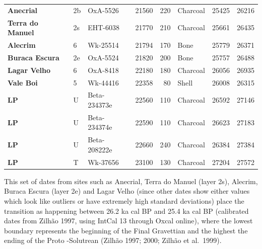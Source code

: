 \documentclass[12pt,twoside]{reedthesis}
\begin{document}
\begin{table}
\begin{tabular}[t]{>{\bfseries}lllrrlrr}
Anecrial & 2b & OxA-5526 & 21560 & 220 & Charcoal & 25425 & 26216\\
Terra do Manuel & 2s & EHT-6038 & 21770 & 210 & Charcoal & 25661 & 26435\\
Alecrim & 6 & Wk-25514 & 21794 & 170 & Bone & 25779 & 26371\\
Buraca Escura & 2e & OxA-5524 & 21820 & 200 & Bone & 25757 & 26488\\
\addlinespace
Lagar Velho & 6 & OxA-8418 & 22180 & 180 & Charcoal & 26056 & 26935\\
Vale Boi & 5 & Wk-44416 & 22358 & 80 & Shell & 26008 & 26315\\
LP & U & Beta-234373e & 22560 & 110 & Charcoal & 26592 & 27146\\
LP & U & Beta-234374e & 22590 & 110 & Charcoal & 26623 & 27183\\
LP & U & Beta-208222e & 22660 & 240 & Charcoal & 26384 & 27384\\
\addlinespace
LP & T & Wk-37656 & 23100 & 130 & Charcoal & 27204 & 27572\\
\bottomrule
\end{tabular}
\end{table}
This set of dates from sites such as Anecrial, Terra do Manuel (layer 2s), Alecrim, Buraca Escura (layer 2e) and Lagar Velho (since other dates show either values which look like outliers or have extremely high standard deviations) place the transition as happening between 26.2 ka cal BP and 25.4 ka cal BP (calibrated dates from Zilhão 1997, using IntCal 13 through Oxcal online), where the lowest boundary represents the beginning of the Final Gravettian and the highest the ending of the Proto -Solutrean (Zilhão 1997; 2000; Zilhão et al.~1999).
\end{document}
